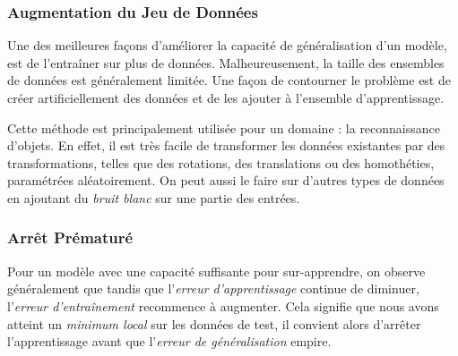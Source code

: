 \documentclass[a4paper, 11pt]{report}
\begin{document}
\subsubsection{Augmentation du Jeu de Données}
Une des meilleures façons d'améliorer la capacité de généralisation d'un modèle, est de l'entraîner sur plus de données.
Malheureusement, la taille des ensembles de données est généralement limitée.
Une façon de contourner le problème est de créer artificiellement des données et de les ajouter à l'ensemble d'apprentissage.

Cette méthode est principalement utilisée pour un domaine : la reconnaissance d'objets.
En effet, il est très facile de transformer les données existantes par des transformations, telles que des rotations, des translations ou des homothéties, paramétrées aléatoirement.
On peut aussi le faire sur d'autres types de données en ajoutant du \emph{bruit blanc} sur une partie des entrées.
\subsubsection{Arrêt Prématuré}
Pour un modèle avec une capacité suffisante pour sur-apprendre, on observe généralement que tandis que l'\emph{erreur d'apprentissage} continue de diminuer, l'\emph{erreur d'entraînement} recommence à augmenter.
Cela signifie que nous avons atteint un \emph{minimum local} sur les données de test, il convient alors d'arrêter l'apprentissage avant que l'\emph{erreur de généralisation} empire.
\end{document}
